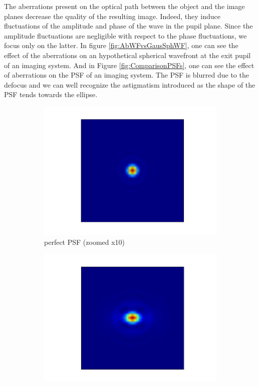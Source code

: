 The aberrations present on the optical path between the object and the image planes decrease the quality of the resulting image. Indeed, they induce fluctuations of the amplitude and phase of the wave in the pupil plane. Since the amplitude fluctuations are negligible with respect to the phase fluctuations, we focus only on the latter. In figure \ref{fig:AbWFvsGausSphWF}, one can see the effect of the aberrations on an hypothetical spherical wavefront at the exit pupil of an imaging system. And in Figure \ref{fig:ComparisonPSFs}, one can see the effect of aberrations on the PSF of an imaging system. The PSF is blurred due to the defocus and we can well recognize the astigmatism introduced as the shape of the PSF tends towards the ellipse. 

\begin{figure}
 \centering
     \begin{subfigure}{0.4\textwidth}
         \includegraphics[width=\textwidth]{Figures/PSFzoom}
         \caption{perfect PSF (zoomed x10)}
         \label{subfig:perfPSF}
     \end{subfigure}
     \quad
     \begin{subfigure}{0.4\textwidth}
         \includegraphics[width=\textwidth]{Figures/PSFzoomWthAb}

\end{subfigure}
\end{figure}
